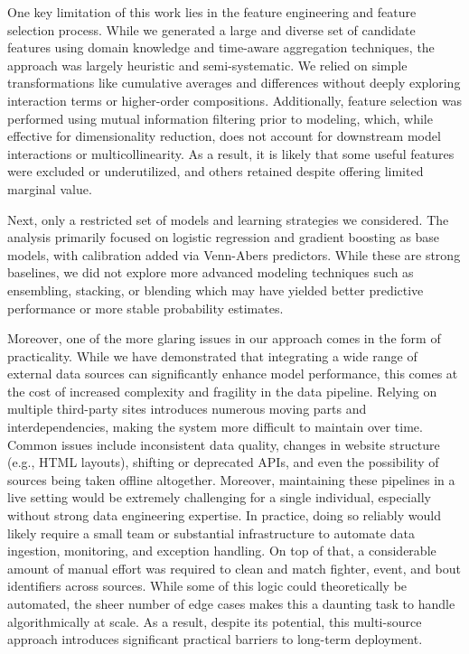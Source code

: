 \documentclass[12pt,twoside]{report}
\begin{document}
One key limitation of this work lies in the feature engineering and feature selection process. While we generated a large and diverse set of candidate features using domain knowledge and time-aware aggregation techniques, the approach was largely heuristic and semi-systematic. We relied on simple transformations like cumulative averages and differences without deeply exploring interaction terms or higher-order compositions. Additionally, feature selection was performed using mutual information filtering prior to modeling, which, while effective for dimensionality reduction, does not account for downstream model interactions or multicollinearity. As a result, it is likely that some useful features were excluded or underutilized, and others retained despite offering limited marginal value.

Next, only a restricted set of models and learning strategies we considered. The analysis primarily focused on logistic regression and gradient boosting as base models, with calibration added via Venn-Abers predictors. While these are strong baselines, we did not explore more advanced modeling techniques such as ensembling, stacking, or blending which may have yielded better predictive performance or more stable probability estimates.

Moreover, one of the more glaring issues in our approach comes in the form of practicality. While we have demonstrated that integrating a wide range of external data sources can significantly enhance model performance, this comes at the cost of increased complexity and fragility in the data pipeline. Relying on multiple third-party sites introduces numerous moving parts and interdependencies, making the system more difficult to maintain over time. Common issues include inconsistent data quality, changes in website structure (e.g., HTML layouts), shifting or deprecated APIs, and even the possibility of sources being taken offline altogether. Moreover, maintaining these pipelines in a live setting would be extremely challenging for a single individual, especially without strong data engineering expertise. In practice, doing so reliably would likely require a small team or substantial infrastructure to automate data ingestion, monitoring, and exception handling. On top of that, a considerable amount of manual effort was required to clean and match fighter, event, and bout identifiers across sources. While some of this logic could theoretically be automated, the sheer number of edge cases makes this a daunting task to handle algorithmically at scale. As a result, despite its potential, this multi-source approach introduces significant practical barriers to long-term deployment.
\end{document}
